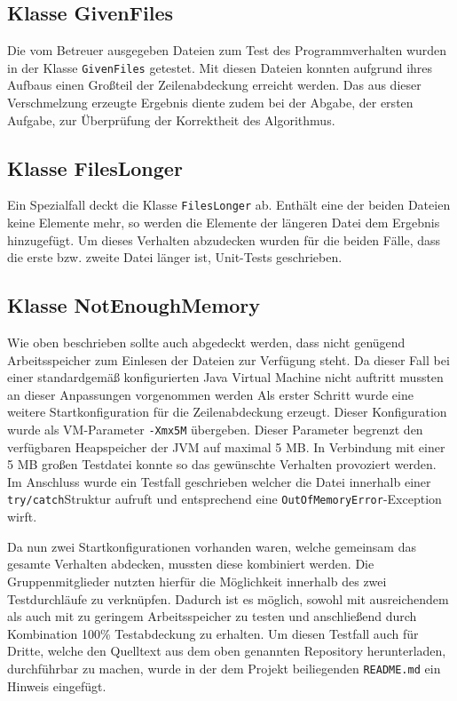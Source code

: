 \documentclass[a4paper,titlepage,12pt]{scrartcl}
\begin{document}
\subsection{Klasse GivenFiles}
\label{sec:givenfiles}
Die vom Betreuer ausgegeben Dateien zum Test des Programmverhalten wurden in der Klasse \texttt{GivenFiles} getestet. Mit diesen Dateien konnten aufgrund ihres Aufbaus einen Großteil der Zeilenabdeckung erreicht werden. Das aus dieser Verschmelzung erzeugte Ergebnis diente zudem bei der Abgabe, der ersten Aufgabe, zur Überprüfung der Korrektheit des Algorithmus.

\subsection{Klasse FilesLonger}
\label{sec:fileslonger}
Ein Spezialfall deckt die Klasse \texttt{FilesLonger} ab. Enthält eine der beiden Dateien keine Elemente mehr, so werden die Elemente der längeren Datei dem Ergebnis hinzugefügt.
Um dieses Verhalten abzudecken wurden für die beiden Fälle, dass die erste bzw. zweite Datei länger ist, Unit-Tests geschrieben.

\subsection{Klasse NotEnoughMemory}
\label{sec:notenoughmemory}
Wie oben beschrieben sollte auch abgedeckt werden, dass nicht genügend Arbeitsspeicher zum Einlesen der Dateien zur Verfügung steht.
Da dieser Fall bei einer standardgemäß konfigurierten Java Virtual Machine nicht auftritt mussten an dieser Anpassungen vorgenommen werden 	Als erster Schritt wurde eine weitere Startkonfiguration für die Zeilenabdeckung erzeugt. Dieser Konfiguration wurde als VM-Parameter \texttt{-Xmx5M} übergeben.
Dieser Parameter begrenzt den verfügbaren Heapspeicher der JVM auf maximal 5 MB. In Verbindung mit einer 5 MB großen Testdatei konnte so das gewünschte Verhalten provoziert werden.
Im Anschluss wurde ein Testfall geschrieben welcher die Datei innerhalb einer \texttt{try/catch}\-Struktur aufruft und entsprechend eine \texttt{OutOfMemoryError}-Exception wirft.

Da nun zwei Startkonfigurationen vorhanden waren, welche gemeinsam das gesamte Verhalten abdecken, mussten diese kombiniert werden.
Die Gruppenmitglieder nutzten hierfür die Möglichkeit innerhalb des \citep{www:ECLEMMA} zwei Testdurchläufe zu verknüpfen.
Dadurch ist es möglich, sowohl mit ausreichendem als auch mit zu geringem Arbeitsspeicher zu testen und anschließend durch Kombination 100\% Testabdeckung zu erhalten.
Um diesen Testfall auch für Dritte, welche den Quelltext aus dem oben genannten Repository herunterladen, durchführbar zu machen, wurde in der dem Projekt beiliegenden \texttt{README.md} ein Hinweis eingefügt.

\clearpage
\appendix



\end{document}
